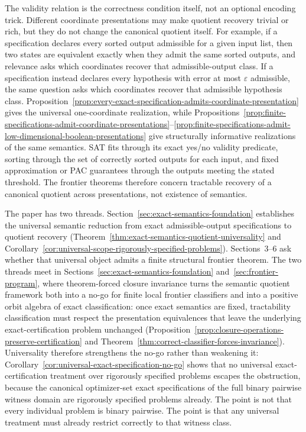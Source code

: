 The validity relation is the correctness condition itself, not an optional encoding trick. Different coordinate presentations may make quotient recovery trivial or rich, but they do not change the canonical quotient itself. For example, if a specification declares every sorted output admissible for a given input list, then two states are equivalent exactly when they admit the same sorted outputs, and relevance asks which coordinates recover that admissible-output class. If a specification instead declares every hypothesis with error at most $\varepsilon$ admissible, the same question asks which coordinates recover that admissible hypothesis class. Proposition~\ref{prop:every-exact-specification-admits-coordinate-presentation} gives the universal one-coordinate realization, while Propositions~\ref{prop:finite-specifications-admit-coordinate-presentations}--\ref{prop:finite-specifications-admit-low-dimensional-boolean-presentations} give structurally informative realizations of the same semantics. SAT fits through its exact yes/no validity predicate, sorting through the set of correctly sorted outputs for each input, and fixed approximation or PAC guarantees through the outputs meeting the stated threshold. The frontier theorems therefore concern tractable recovery of a canonical quotient across presentations, not existence of semantics.

The paper has two threads. Section~\ref{sec:exact-semantics-foundation} establishes the universal semantic reduction from exact admissible-output specifications to quotient recovery (Theorem~\ref{thm:exact-semantics-quotient-universality} and Corollary~\ref{cor:universal-scope-rigorously-specified-problems}). Sections~3--6 ask whether that universal object admits a finite structural frontier theorem. The two threads meet in Sections~\ref{sec:exact-semantics-foundation} and~\ref{sec:frontier-program}, where theorem-forced closure invariance turns the semantic quotient framework both into a no-go for finite local frontier classifiers and into a positive orbit algebra of exact classification: once exact semantics are fixed, tractability classification must respect the presentation equivalences that leave the underlying exact-certification problem unchanged (Proposition~\ref{prop:closure-operations-preserve-certification} and Theorem~\ref{thm:correct-classifier-forces-invariance}). Universality therefore strengthens the no-go rather than weakening it: Corollary~\ref{cor:universal-exact-specification-no-go} shows that no universal exact-certification treatment over rigorously specified problems escapes the obstruction, because the canonical optimizer-set exact specifications of the full binary pairwise witness domain are rigorously specified problems already. The point is not that every individual problem is binary pairwise. The point is that any universal treatment must already restrict correctly to that witness class.

